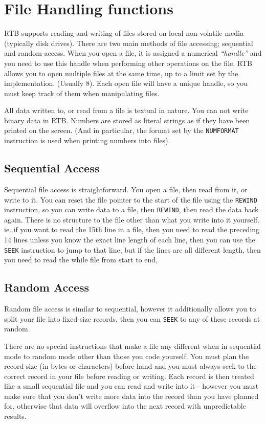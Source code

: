 \chapter{File Handling functions}

RTB supports reading and writing of files stored on local non-volatile
media (typically disk drives). There are two main methods of file
accessing; sequential and random-access. When you open a file, it is
assigned a numerical {\em ``handle''} and you need to use this handle when
performing other operations on the file. RTB allows you to open multiple
files at the same time, up to a limit set by the implementation. (Usually
8). Each open file will have a unique handle, so you must keep track of
them when manipulating files.

All data written to, or read from a file is textual in nature. You can not
write binary data in RTB. Numbers are stored as literal strings as if they
have been printed on the screen. (And in particular, the format set by
the {\tt NUMFORMAT} instruction is used when printing numbers into files).

\section{Sequential Access}
Sequential file access is straightforward. You open a file, then read from
it, or write to it. You can reset the file pointer to the start of the
file using the {\tt REWIND} instruction, so you can write data to a file,
then {\tt REWIND}, then read the data back again. There is no structure
to the file other than what you write into it yourself. ie. if you want
to read the 15th line in a file, then you need to read the preceding 14
lines unless you know the exact line length of each line, then you can use
the {\tt SEEK} instruction to jump to that line, but if the lines are all
different length, then you need to read the while file from start to end,

\section{Random Access}
Random file access is similar to sequential, however it additionally
allows you to split your file into fixed-size records, then
you can {\tt SEEK} to any of these records at random.

There are no special instructions that make a file any different when in
sequential mode to random mode other than those you code yourself. You
must plan the record size (in bytes or characters) before hand and you
must always seek to the correct record in your file before reading or
writing. Each record is then treated like a small sequential file and you
can read and write into it - however you must make sure that you don't
write more data into the record than you have planned for, otherwise
that data will overflow into the next record with unpredictable results.

